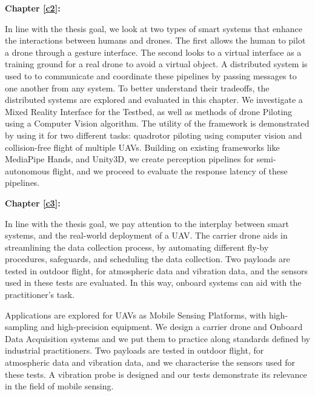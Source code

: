 \textbf{Chapter \ref{c2}: }

In line with the thesis goal, we look at two types of smart systems that enhance the interactions between humans and drones. The first allows the human to pilot a drone through a gesture interface. The second looks to a virtual interface as a training ground for a real drone to avoid a virtual object. A distributed system is used to to communicate and coordinate these pipelines by passing messages to one another from any system. To better understand their tradeoffs, the distributed systems are explored and evaluated in this chapter.
We investigate a Mixed Reality Interface for the Testbed, as well as methods of drone Piloting using a Computer Vision algorithm. The utility of the framework is demonstrated by using it for two different tasks: quadrotor piloting using computer vision and collision-free flight of multiple UAVs. Building on existing frameworks like MediaPipe Hands, and Unity3D, we create perception pipelines for semi-autonomous flight, and we proceed to evaluate the response latency of these pipelines.

\textbf{Chapter \ref{c3}: }

In line with the thesis goal, we pay attention to the interplay between smart systems, and the real-world deployment of a UAV. The carrier drone aids in streamlining the data collection process, by automating different fly-by procedures, safeguards, and scheduling the data collection. Two payloads are tested in outdoor flight, for atmospheric data and vibration data, and the sensors used in these tests are evaluated. In this way, onboard systems can aid with the practitioner’s task.

Applications are explored for UAVs as Mobile Sensing Platforms, with high-sampling and high-precision equipment. We design a carrier drone and Onboard Data Acquisition systems and we put them to practice along standards defined by industrial practitioners. Two payloads are tested in outdoor flight, for atmospheric data and vibration data, and we characterise the sensors used for these tests. A vibration probe is designed and our tests demonstrate its relevance in the field of mobile sensing.


